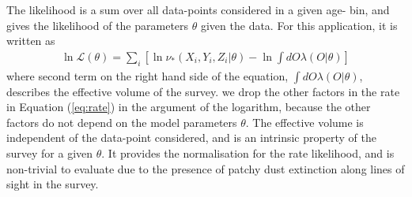 The likelihood is a sum over all data-points considered in a given age-\feh{} bin, and gives the likelihood of the parameters $\theta$ given the data. For this application, it is written as
\begin{multline}
\ln \mathcal{L}(\theta) = \sum_{i} \left[ \ln \nu_{*}(X_i, Y_i, Z_i|\theta)- \ln \int dO \lambda(O|\theta) \right]
\label{eq:likelihood}
\end{multline}
where second term on the right hand side of the equation, $ \int dO \lambda(O|\theta)$, describes the effective volume of the survey. we drop the other factors in the rate in Equation (\ref{eq:rate}) in the argument of the logarithm, because the other factors do not depend on the model parameters $\theta$. The effective volume is independent of the data-point considered, and is an intrinsic property of the survey for a given $\theta$. It provides the normalisation for the rate likelihood, and is non-trivial to evaluate due to the presence of patchy dust extinction along lines of sight in the survey.

